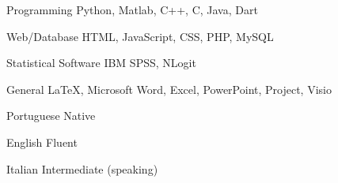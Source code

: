 

\begin{cvskills}

  \cvskill
    {Programming} %
    {Python, Matlab, C++, C, Java, Dart} %

  \cvskill
    {Web/Database} %
    {HTML, JavaScript, CSS, PHP, MySQL} %
    
  \cvskill
    {Statistical Software} %
    {IBM SPSS, NLogit} %
 
  \cvskill
    {General} %
    {\LaTeX, Microsoft Word, Excel, PowerPoint, Project, Visio} %
    
\end{cvskills}


\begin{cvskills}

  \cvskill
    {Portuguese} %
    {Native} %

  \cvskill
    {English} %
    {Fluent} %
    
  \cvskill
    {Italian} %
    {Intermediate (speaking)} %
    
\end{cvskills}